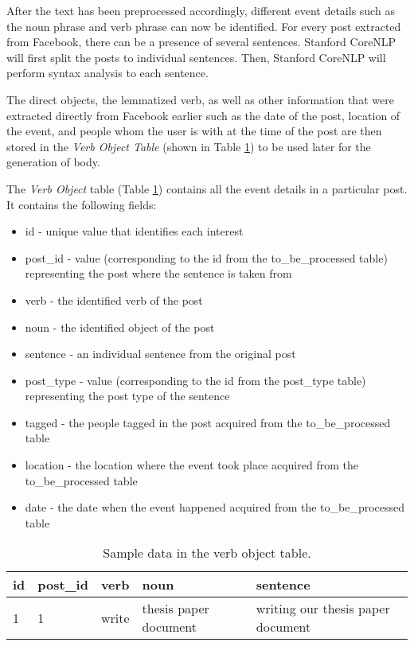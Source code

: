 After the text has been preprocessed accordingly, different event details such as the noun phrase and verb phrase can now be identified. For every post extracted from Facebook, there can be a presence of several sentences. Stanford CoreNLP will first split the posts to individual sentences. Then, Stanford CoreNLP will perform syntax analysis to each sentence.

The direct objects, the lemmatized verb, as well as other information that were extracted directly from Facebook earlier such as the date of the post, location of the event, and people whom the user is with at the time of the post are then stored in the \textit{Verb Object Table} (shown in Table \ref{tab:sampleVO}) to be used later for the generation of body.

The \textit{Verb Object} table (Table \ref{tab:sampleVO}) contains all the event details in a particular post. It contains the following fields:
\begin{itemize}
	\item id - unique value that identifies each interest
	\item post\_id - value (corresponding to the id from the to\_be\_processed table) representing the post where the sentence is taken from 
	\item verb - the identified verb of the post
	\item noun - the identified object of the post
	\item sentence - an individual sentence from the original post
	\item post\_type - value (corresponding to the id from the post\_type table) representing the post type of the sentence
	\item tagged - the people tagged in the post acquired from the to\_be\_processed table
	\item location - the location where the event took place acquired from the to\_be\_processed table
	\item date - the date when the event happened acquired from the to\_be\_processed table
\end{itemize}
\clearpage
\begin{table}[ph!]   
\centering
\caption{Sample data in the verb object table.} \vspace{0.25em}
\begin{tabular}{|p{1cm}|p{1in}|p{1.5cm}|p{1in}|p{1in}|} \hline
\textbf{id} & \textbf{post\_id} & \textbf{verb} & \textbf{noun} & \textbf{sentence}\\ \hline
1&1&write&thesis paper document&writing our thesis paper document \\ \hline
\end{tabular}
\label{tab:sampleVO}
\end{table}

